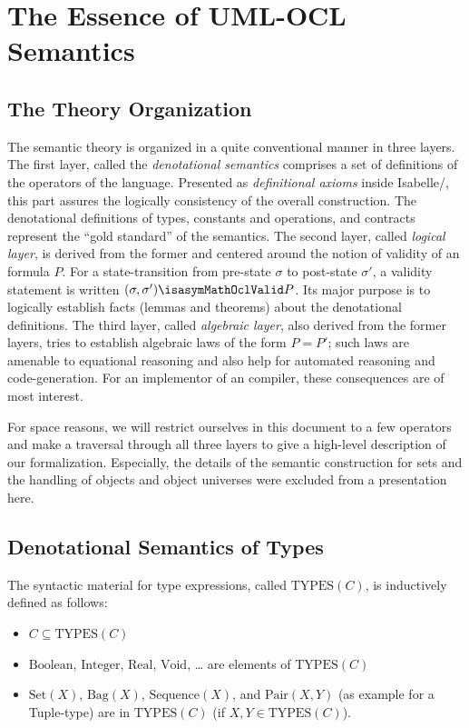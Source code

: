 \section{The Essence of UML-OCL Semantics}
\subsection{The Theory Organization}
The semantic theory is organized in a quite conventional manner in
three layers. The first layer, called the \emph{denotational
  semantics} comprises a set of definitions of the operators of the
language.  Presented as \emph{definitional axioms} inside
Isabelle/\HOL, this part assures the logically consistency of the
overall construction. The denotational definitions of types, constants
and operations, and \OCL contracts represent the ``gold standard'' of the
semantics. The second layer, called \emph{logical layer},
is derived from the former and centered around the notion of validity
of an \OCL formula $P$. For a state-transition from pre-state $\sigma$
to post-state $\sigma'$, a validity statement is written $(\sigma,
\sigma') \isasymMathOclValid P$. Its major purpose is to logically establish facts
(lemmas and theorems) about the denotational definitions.
The third layer, called \emph{algebraic layer},
also derived from the former layers, tries to establish algebraic laws
of the form $P = P'$; such laws are amenable to equational reasoning
and also help for automated reasoning and code-generation. For an
implementor of an \OCL compiler, these consequences are of most interest.

For space reasons, we will restrict ourselves in this document to a few
operators and make a traversal through all three layers to give a
high-level description of our formalization.  Especially, the details
of the semantic construction for sets and the handling of objects and
object universes were excluded from a presentation here.

\subsection{Denotational Semantics of Types}
The syntactic material for type expressions, called $\text{TYPES}(C)$, is 
inductively defined as follows:
\begin{itemize}
\item $C \subseteq \text{TYPES}(C)$
\item $\text{Boolean}$, $\text{Integer}$, $\text{Real}$, $\text{Void}$, \ldots
      are elements of $\text{TYPES}(C)$
\item $\text{Set}(X)$, $\text{Bag}(X)$, $\text{Sequence}(X)$,  and 
      $\text{Pair}(X,Y)$ (as example for a Tuple-type)
      are in  $\text{TYPES}(C)$ (if $X, Y \in \text{TYPES}(C)$).
\end{itemize}


